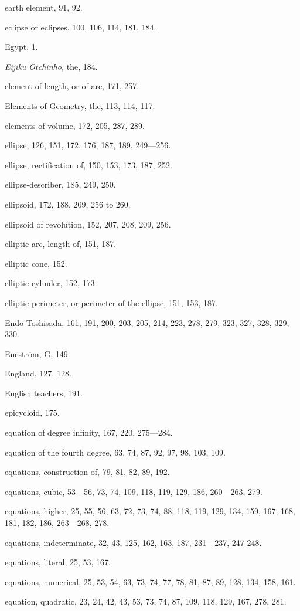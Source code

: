 \documentclass[11pt]{article}
\begin{document}
\medskip
earth element, 91, 92.\par
eclipse or eclipses, 100, 106, 114, 181, 184.\par
Egypt, 1.\par
\emph{Eijiku Otchinhō,} the, 184.\par
element of length, or of arc, 171, 257.\par
Elements of Geometry, the, 113, 114, 117.\par
elements of volume, 172, 205, 287, 289.\par
ellipse, 126, 151, 172, 176, 187, 189, 249—256.\par
ellipse, rectification of, 150, 153, 173, 187, 252.\par
ellipse-describer, 185, 249, 250.\par
ellipsoid, 172, 188, 209, 256 to 260.\par
ellipsoid of revolution, 152, 207, 208, 209, 256.\par
elliptic arc, length of, 151, 187.\par
elliptic cone, 152.\par
elliptic cylinder, 152, 173.\par
elliptic perimeter, or perimeter of the ellipse, 151, 153, 187.\par
Endō Toshisada, 161, 191, 200, 203, 205, 214, 223, 278, 279, 323, 327, 328, 329, 330.\par
Eneström, G, 149.\par
England, 127, 128.\par
English teachers, 191.\par
epicycloid, 175.\par
equation of degree infinity, 167, 220, 275—284.\par
equation of the fourth degree, 63, 74, 87, 92, 97, 98, 103, 109.\par
equations, construction of, 79, 81, 82, 89, 192.\par
equations, cubic, 53—56, 73, 74, 109, 118, 119, 129, 186, 260—263, 279.\par
equations, higher, 25, 55, 56, 63, 72, 73, 74, 88, 118, 119, 129, 134, 159, 167, 168, 181, 182, 186, 263—268, 278.\par
equations, indeterminate, 32, 43, 125, 162, 163, 187, 231—237, 247-248.\par
equations, literal, 25, 53, 167.\par
equations, numerical, 25, 53, 54, 63, 73, 74, 77, 78, 81, 87, 89, 128, 134, 158, 161.\par
equation, quadratic, 23, 24, 42, 43, 53, 73, 74, 87, 109, 118, 129, 167, 278, 281.\par
\end{document}
